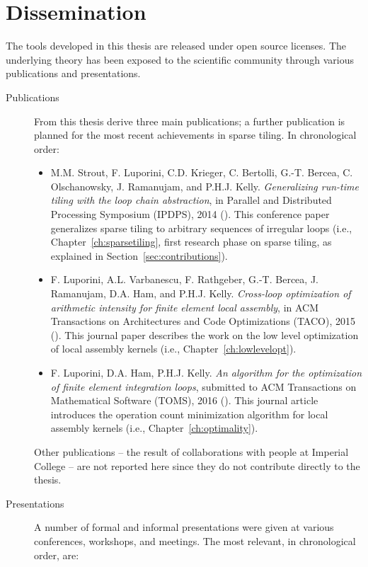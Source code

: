 \section{Dissemination}
The tools developed in this thesis are released under open source licenses. The underlying theory has been exposed to the scientific community through various publications and presentations.

\begin{description}
\item[Publications] From this thesis derive three main publications; a further publication is planned for the most recent achievements in sparse tiling. In chronological order:
\begin{itemize}
\item M.M. Strout, F. Luporini, C.D. Krieger, C. Bertolli, G.-T. Bercea, C. Olschanowsky, J. Ramanujam, and P.H.J. Kelly. {\em Generalizing run-time tiling with the loop chain abstraction}, in Parallel and Distributed Processing Symposium (IPDPS), 2014 (\cite{st-paper}). This conference paper generalizes sparse tiling to arbitrary sequences of irregular loops (i.e., Chapter~\ref{ch:sparsetiling}, first research phase on sparse tiling, as explained in Section~\ref{sec:contributions}).
\item F. Luporini, A.L. Varbanescu, F. Rathgeber, G.-T. Bercea, J. Ramanujam, D.A. Ham, and P.H.J. Kelly. {\em Cross-loop optimization of arithmetic intensity for finite element local assembly}, in ACM Transactions on Architectures and Code Optimizations (TACO), 2015 (\cite{Luporini-coffee}). This journal paper describes the work on the low level optimization of local assembly kernels (i.e., Chapter~\ref{ch:lowlevelopt}).
\item F. Luporini, D.A. Ham, P.H.J. Kelly. {\em An algorithm for the optimization of finite element integration loops}, submitted to ACM Transactions on Mathematical Software (TOMS), 2016 (\cite{Luporini-minimalflops}). This journal article introduces the operation count minimization algorithm for local assembly kernels (i.e., Chapter~\ref{ch:optimality}).
\end{itemize}
Other publications -- the result of collaborations with people at Imperial College -- are not reported here since they do not contribute directly to the thesis.
\item[Presentations] A number of formal and informal presentations were given at various conferences, workshops, and meetings. The most relevant, in chronological order, are:
\begin{itemize}

\end{itemize}
\end{description}
